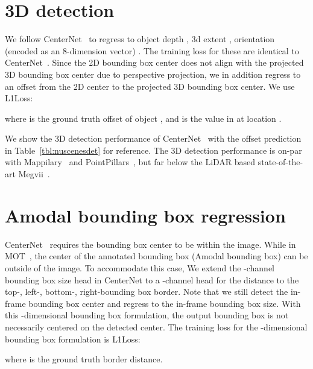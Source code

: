 \documentclass[runningheads]{llncs}
\newcommand{\reftab}[1]{Table~\ref{tbl:#1}}
\begin{document}
\section{3D detection}

We follow CenterNet~\cite{zhou2019objects} to regress to object depth , 3d extent , orientation (encoded as an 8-dimension vector) . The training loss for these are identical to CenterNet~\cite{zhou2019objects}.
Since the 2D bounding box center does not align with the projected 3D bounding box center due to perspective projection, we in addition regress to an offset from the 2D center to the projected 3D bounding box center. We use L1Loss:


\noindent where  is the ground truth offset of object , and  is the value in  at location . 

We show the 3D detection performance of CenterNet~\cite{zhou2019objects} with the offset prediction in \reftab{nuscenesdet} for reference. The 3D detection performance is on-par with Mappilary~\cite{simonelli2019disentangling} and PointPillars~\cite{lang2019pointpillars}, but far below the LiDAR based state-of-the-art Megvii~\cite{zhu2019class}.

\section{Amodal bounding box regression}

CenterNet~\cite{zhou2019objects} requires the bounding box center to be within the image.
While in MOT~\cite{MOT16}, the center of the annotated bounding box (Amodal bounding box) can be outside of the image. To accommodate this case, We extend the -channel bounding 
box size head in CenterNet to a -channel head  for the distance to the top-, left-, bottom-, right-bounding box border. 
Note that we still detect the in-frame bounding box center and regress to the in-frame bounding box size.
With this -dimensional bounding box formulation, the output bounding box is not necessarily centered on the detected center. The training loss for the -dimensional bounding box formulation is L1Loss:

where  is the ground truth border distance.
\end{document}
